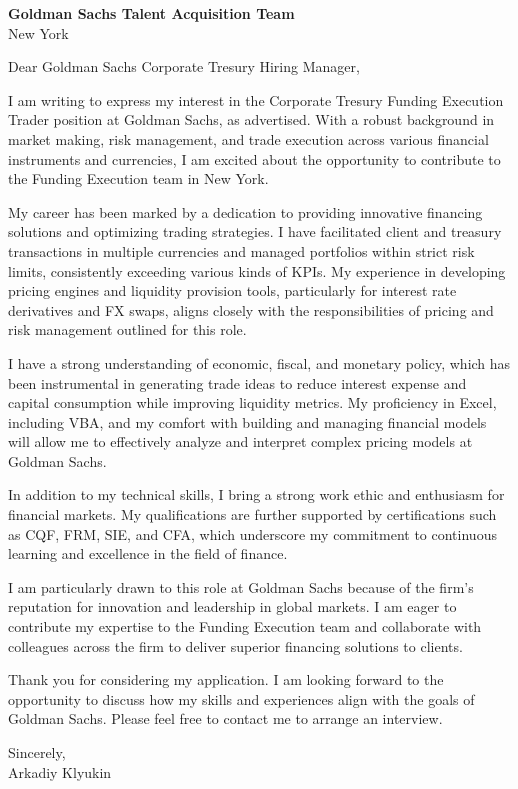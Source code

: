 \documentclass{letter}
\begin{document}
\begin{letter}{\textbf{Goldman Sachs Talent Acquisition Team} \\
                
                New York }


\opening{Dear Goldman Sachs Corporate Tresury Hiring Manager,}

I am writing to express my interest in the Corporate Tresury Funding Execution Trader position at Goldman Sachs, as advertised. With a robust background in market making, risk management, and trade execution across various financial instruments and currencies, I am excited about the opportunity to contribute to the Funding Execution team in New York.

My career has been marked by a dedication to providing innovative financing solutions and optimizing trading strategies. I have facilitated client and treasury transactions in multiple currencies and managed portfolios within strict risk limits, consistently exceeding various kinds of KPIs. My experience in developing pricing engines and liquidity provision tools, particularly for interest rate derivatives and FX swaps, aligns closely with the responsibilities of pricing and risk management outlined for this role.

I have a strong understanding of economic, fiscal, and monetary policy, which has been instrumental in generating trade ideas to reduce interest expense and capital consumption while improving liquidity metrics. My proficiency in Excel, including VBA, and my comfort with building and managing financial models will allow me to effectively analyze and interpret complex pricing models at Goldman Sachs.

In addition to my technical skills, I bring a strong work ethic and enthusiasm for financial markets. My qualifications are further supported by certifications such as CQF, FRM, SIE, and CFA, which underscore my commitment to continuous learning and excellence in the field of finance.

I am particularly drawn to this role at Goldman Sachs because of the firm's reputation for innovation and leadership in global markets. I am eager to contribute my expertise to the Funding Execution team and collaborate with colleagues across the firm to deliver superior financing solutions to clients.

Thank you for considering my application. I am looking forward to the opportunity to discuss how my skills and experiences align with the goals of Goldman Sachs. Please feel free to contact me to arrange an interview.

Sincerely,\\
Arkadiy Klyukin
\end{letter}
\end{document}
